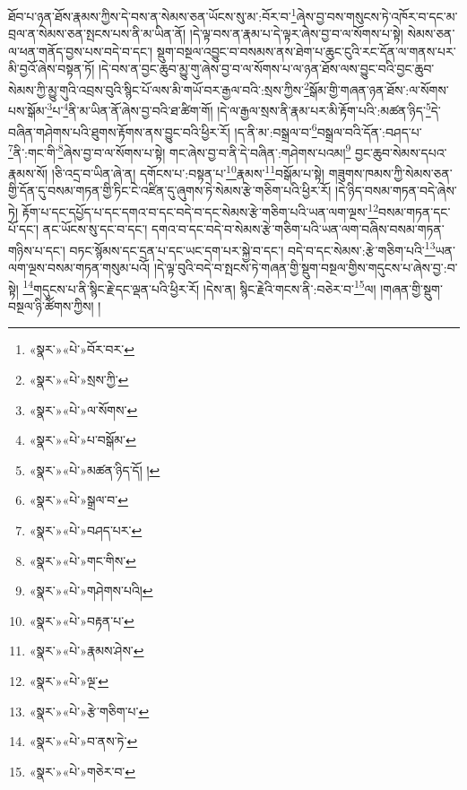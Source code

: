ཐོབ་པ་ཉན་ཐོས་རྣམས་ཀྱིས་དེ་བས་ན་སེམས་ཅན་ཡོངས་སུ་མ་:བོར་བ་\footnote{«སྣར་»«པེ་»བོར་བར་}ཞེས་བྱ་བས་གསུངས་ཏེ་འཁོར་བ་དང་མ་བྲལ་ན་སེམས་ཅན་སྤངས་པས་ནི་མ་ཡིན་ནོ། །དེ་ལྟ་བས་ན་རྣམ་པ་དེ་ལྟར་ཞེས་བྱ་བ་ལ་སོགས་པ་སྟེ། སེམས་ཅན་ལ་ཕན་གནོད་བྱས་པས་བདེ་བ་དང་། སྡུག་བསྔལ་འབྱུང་བ་བསམས་ནས་ཐེག་པ་ཆུང་ངུའི་རང་དོན་ལ་གནས་པར་མི་བྱའོ་ཞེས་བསྟན་ཏོ། །དེ་བས་ན་བྱང་ཆུབ་མྱུ་གུ་ཞེས་བྱ་བ་ལ་སོགས་པ་ལ་ཉན་ཐོས་ལས་བྱུང་བའི་བྱང་ཆུབ་སེམས་ཀྱི་མྱུ་གུའི་འབྲས་བུའི་སྙིང་པོ་ལས་མི་གཡོ་བར་རྒྱལ་བའི་:སྲས་ཀྱིས་\footnote{«སྣར་»«པེ་»སྲས་ཀྱི་}སྒོམ་གྱི་གཞན་ཉན་ཐོས་:ལ་སོགས་པས་སྒོམ་\footnote{«སྣར་»«པེ་»ལ་སོགས་}པ་\footnote{«སྣར་»«པེ་»པ་བསྒོམ་}ནི་མ་ཡིན་ནོ་ཞེས་བྱ་བའི་ཐ་ཚིག་གོ། །དེ་ལ་རྒྱལ་སྲས་ནི་རྣམ་པར་མི་རྟོག་པའི་:མཚན་ཉིད་\footnote{«སྣར་»«པེ་»མཚན་ཉིད་དོ། །}དེ་བཞིན་གཤེགས་པའི་ཐུགས་རྟོགས་ནས་བྱུང་བའི་ཕྱིར་རོ། །ད་ནི་མ་:བསྒྲལ་བ་\footnote{«སྣར་»«པེ་»སྒྲལ་བ་}བསྒྲལ་བའི་དོན་:བཤད་པ་\footnote{«སྣར་»«པེ་»བཤད་པར་}ནི་:གང་གི་\footnote{«སྣར་»«པེ་»གང་གིས་}ཞེས་བྱ་བ་ལ་སོགས་པ་སྟེ། གང་ཞེས་བྱ་བ་ནི་དེ་བཞིན་:གཤེགས་པའམ།\footnote{«སྣར་»«པེ་»གཤེགས་པའི།} བྱང་ཆུབ་སེམས་དཔའ་རྣམས་སོ། །ཅི་འདྲ་བ་ཡིན་ཞེ་ན། དགོངས་པ་:བསྟན་པ་\footnote{«སྣར་»«པེ་»བརྟན་པ་}རྣམས་\footnote{«སྣར་»«པེ་»རྣམས་ཤེས་}བསྒོམ་པ་སྟེ། གཟུགས་ཁམས་ཀྱི་སེམས་ཅན་གྱི་དོན་དུ་བསམ་གཏན་གྱི་ཏིང་ངེ་འཛིན་དུ་ཞུགས་ཏེ་སེམས་རྩེ་གཅིག་པའི་ཕྱིར་རོ། །དེ་ཉིད་བསམ་གཏན་བདེ་ཞེས་ཏེ། རྟོག་པ་དང་དཔྱོད་པ་དང་དགའ་བ་དང་བདེ་བ་དང་སེམས་རྩེ་གཅིག་པའི་ཡན་ལག་ལྔས་\footnote{«སྣར་»«པེ་»ལྔ་}བསམ་གཏན་དང་པོ་དང་། ནང་ཡོངས་སུ་དང་བ་དང་། དགའ་བ་དང་བདེ་བ་སེམས་རྩེ་གཅིག་པའི་ཡན་ལག་བཞིས་བསམ་གཏན་གཉིས་པ་དང་། བཏང་སྙོམས་དང་དྲན་པ་དང་ཡང་དག་པར་སྐྱེ་བ་དང་། བདེ་བ་དང་སེམས་:རྩེ་གཅིག་པའི་\footnote{«སྣར་»«པེ་»རྩེ་གཅིག་པ་}ཡན་ལག་ལྔས་བསམ་གཏན་གསུམ་པའོ། །དེ་ལྟ་བུའི་བདེ་བ་སྤངས་ཏེ་གཞན་གྱི་སྡུག་བསྔལ་གྱིས་གདུངས་པ་ཞེས་བྱ་:བ་སྟེ། \footnote{«སྣར་»«པེ་»བ་ནས་ཏེ་}གདུངས་པ་ནི་སྙིང་རྗེ་དང་ལྡན་པའི་ཕྱིར་རོ། །དེས་ན། སྙིང་རྗེའི་གངས་ནི་:བཅེར་བ་\footnote{«སྣར་»«པེ་»གཅེར་བ་}ལ། །གཞན་གྱི་སྡུག་བསྔལ་ཉི་ཚོགས་ཀྱིས། །
